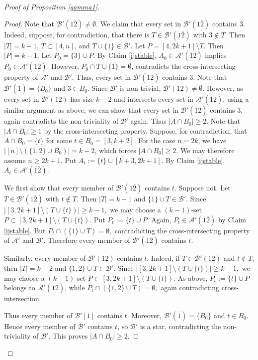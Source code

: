 \documentclass[a4paper,11pt]{article}
\newcommand{\m}{\mathcal}
\begin{document}
\begin{proof}[Proof of Proposition \ref{gamma1}]
\begin{proof}
Note that $\m B'(1\bar2)\ne \emptyset$.
We claim that every set in $\m B'(1\bar2)$ contains $3$. Indeed, suppose, for contradiction, that there is $T\in \m B'(1\bar2)$ with $3\notin T$. Then $|T|=k-1$, $T\subset [4,n]$, and $T\cup \{1\}\in \m B'$.
Let $P=[4, 2k+1]\setminus T$. Then $|P|=k-1$. 
Let $P_0=\{3\}\cup P$. 
By Claim \ref{ijstable}, $A_0\in \m A'(\bar1\bar2)$ implies 
$P_0\in \m A'(\bar1\bar2)$. However,
$P_0\cap T\cup \{1\}=\emptyset$, contradicts the cross-intersecting property of $\m A'$ and $\m B'$. 
Thus, every set in $\m B'(1\bar2)$ contains $3$.
Note that $\m B'(\bar1)=\{B_0\}$ and $3\in B_0$. Since $\m B'$ is non-trivial, $\m B'(12)\ne \emptyset$. However, as every set in $\m B'(12)$ has size $k-2$ and intersects every set in $\m A'(\bar1\bar2)$, 
using a similar argument as above, we can show that every set in $\m B'(\bar1\bar2)$ contains $3$, again contradicts the non-triviality of $\m B'$ again. Thus $|A\cap B_0|\ge 2$.
\fi
Note that $|A\cap B_0|\ge 1$ by the cross-intersecting property.
Suppose,
for contradiction, that 
$A\cap B_0=\{t\}$ for some $t\in B_0=[3,k+2]$.
For the case $n=2k$, we have $|[n]\setminus(\{1,2\}\cup B_0)|=k-2$, which forces $|A\cap B_0|\ge 2$. 
 We may therefore assume
$n\ge 2k+1$.
Put $A_t:=\{t\}\cup [k+3,2k+1].$
By Claim \ref{ijstable}, $A_t\in \m A'(\bar1\bar2).$


We first show that every member of $\m B'(1\bar2)$ contains $t$.
Suppose not. Let $T\in\m B'(1\bar2)$ with $t\notin T$. Then
$|T|=k-1$ and $\{1\}\cup T\in\m B'$. Since $|[3,2k+1]\setminus (T\cup\{t\})|\ge k-1,$
we may choose a $(k-1)$-set $P\subset [3,2k+1]\setminus (T\cup\{t\}).$
Put $P_t:=\{t\}\cup P.$ 
Again, $P_t\in\m A'(\bar1\bar2)$ by
Claim \ref{ijstable}. But $P_t\cap(\{1\}\cup T)=\emptyset,$
contradicting the cross-intersecting property of $\m A'$ and $\m B'$.
Therefore every member of $\m B'(1\bar2)$ contains $t$.

Similarly, every member of $\m B'(12)$ contains $t$. Indeed, if
$T\in\m B'(12)$ and $t\notin T$, then $|T|=k-2$ and
$\{1,2\}\cup T\in\m B'$. Since $|[3,2k+1]\setminus (T\cup\{t\})|\ge k-1,$
we may choose a $(k-1)$-set $P\subset [3,2k+1]\setminus (T\cup\{t\}).$
As above, $P_t:=\{t\}\cup P$ belongs to $\m A'(\bar1\bar2)$, while 
$P_t\cap(\{1,2\}\cup T)=\emptyset,$
again contradicting cross-intersection.

Thus every member of $\m B'[1]$ contains $t$. Moreover,
$\m B'(\bar1)=\{B_0\}$ and $t\in B_0$. Hence every member of $\m B'$
contains $t$, so $\m B'$ is a star, contradicting the non-triviality of
$\m B'$. This proves $|A\cap B_0|\ge 2$.
\end{proof}


\end{proof}
\end{document}
